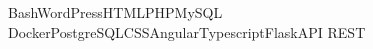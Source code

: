 Bash\spaced WordPress\spaced HTML\spaced PHP\spaced MySQL \spaced Docker\spaced PostgreSQL\spaced CSS\spaced Angular\spaced Typescript\spaced Flask\spaced API REST\,